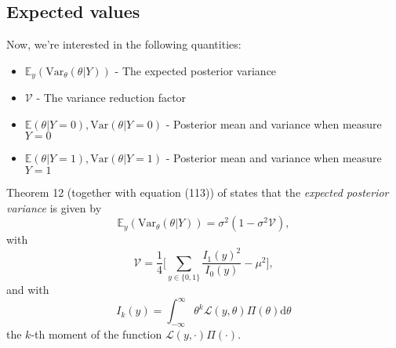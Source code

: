 \documentclass[]{report}
\begin{document}
\subsection{Expected values}
Now, we're interested in the following quantities:
\begin{itemize}
    \item $\mathbb{E}_y(\text{Var}_{\theta}(\theta | Y))$ - The expected posterior variance
    \item $\mathcal{V}$ - The variance reduction factor
    \item $\mathbb{E}(\theta | Y=0), \text{Var}(\theta|Y=0)$ - Posterior mean and variance when measure $Y=0$
    \item $\mathbb{E}(\theta | Y=1), \text{Var}(\theta|Y=1)$ - Posterior mean and variance when measure $Y=1$
\end{itemize}

Theorem 12 (together with equation (113)) of \cite{Koh2020} states that the \textit{expected posterior variance} is given by
\begin{equation}
    \mathbb{E}_y(\text{Var}_{\theta}(\theta | Y)) = \sigma^2(1-\sigma^2\mathcal{V}),
\end{equation}
with
\begin{equation}
    \mathcal{V} = \frac{1}{4}\Bigg[ \sum_{y\in \{0,1\}}\frac{I_1(y)^2}{I_0(y)} - \mu^2\Bigg],
\end{equation}
and with
\begin{equation}
    I_k(y) = \int_{-\infty}^{\infty} \theta^k \mathcal{L}(y, \theta)\Pi(\theta) \text{d}\theta
\end{equation}
the $k$-th moment of the function $\mathcal{L}(y, \cdot)\Pi(\cdot)$.
\end{document}
